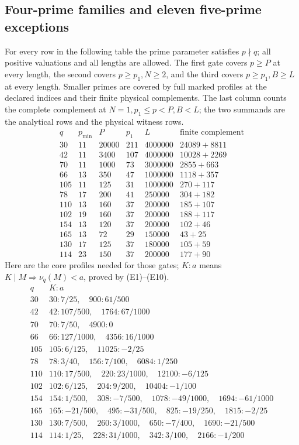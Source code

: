 \documentclass[11pt]{article}
\theoremstyle{definition}\newtheorem{definition}[theorem]{Definition}
\theoremstyle{remark}\newtheorem{remark}[theorem]{Remark}
\begin{document}
\subsection{Four-prime families and eleven five-prime exceptions}
For every row in the following table the prime parameter satisfies
\(p\nmid q\); all positive valuations and all lengths are allowed.
The first gate covers \(p\ge P\) at every length, the second covers
\(p\ge p_1,N\ge2\), and the third covers
\(p\ge p_1,B\ge L\) at every length. Smaller primes are covered by
full marked profiles at the declared indices and their finite physical
complements. The last column counts the complete complement at
\(N=1,p_1\le p<P,B<L\); the two summands are the analytical rows and
the physical witness rows.
\[
\begin{array}{c|r|r|r|r|r}
 q&p_{\min}&P&p_1&L&\text{finite complement}\\\hline
 30&11&20000&211&4000000&24089+8811\\
 42&11&3400&107&4000000&10028+2269\\
 70&11&1000&73&3000000&2855+663\\
 66&13&350&47&1000000&1118+357\\
 105&11&125&31&1000000&270+117\\
 78&17&200&41&250000&304+182\\
 110&13&160&37&200000&185+107\\
 102&19&160&37&200000&188+117\\
 154&13&120&37&200000&102+46\\
 165&13&72&29&150000&43+25\\
 130&17&125&37&180000&105+59\\
 114&23&150&37&200000&177+90
\end{array}                                                        \tag{E16}
\]
Here are the core profiles needed for those gates; \(K:a\) means
\(K\mid M\Rightarrow\nu_q(M)<a\), proved by (E1)--(E10).
\[
\begin{array}{c|l}
 q& K:a\\\hline
30&30:7/25,\quad900:61/500\\
42&42:107/500,\quad1764:67/1000\\
70&70:7/50,\quad4900:0\\
66&66:127/1000,\quad4356:16/1000\\
105&105:6/125,\quad11025:-2/25\\
78&78:3/40,\quad156:7/100,\quad6084:1/250\\
110&110:17/500,\quad220:23/1000,\quad12100:-6/125\\
102&102:6/125,\quad204:9/200,\quad10404:-1/100\\
154&154:1/500,\quad308:-7/500,\quad1078:-49/1000,\quad1694:-61/1000\\
165&165:-21/500,\quad495:-31/500,\quad825:-19/250,\quad1815:-2/25\\
130&130:7/500,\quad260:3/1000,\quad650:-7/400,\quad1690:-21/500\\
114&114:1/25,\quad228:31/1000,\quad342:3/100,\quad2166:-1/200
\end{array}                                                        \tag{E17}
\]
\end{document}
